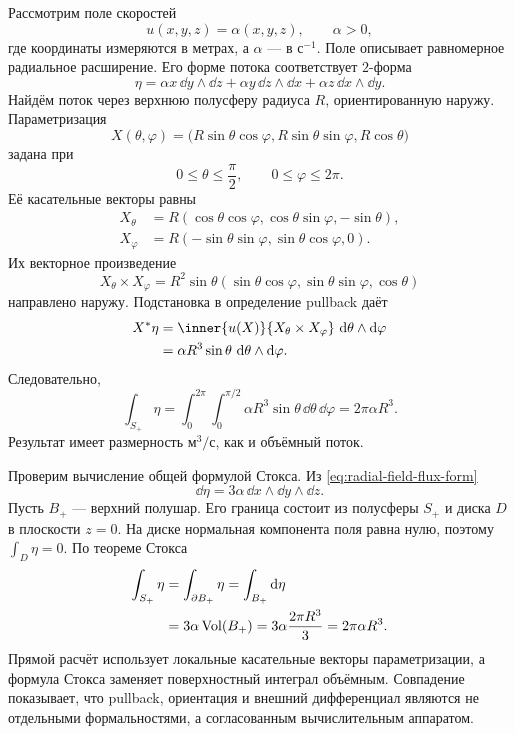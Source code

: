 Рассмотрим поле скоростей
\begin{equation}
\label{eq:radial-expansion-field}
u(x,y,z)=\alpha(x,y,z),
\qquad
\alpha>0,
\end{equation}
где координаты измеряются в метрах, а \(\alpha\) --- в \(\text{с}^{-1}\). Поле описывает равномерное радиальное расширение. Его форме потока соответствует \(2\)-форма
\begin{equation}
\label{eq:radial-field-flux-form}
\eta
=
\alpha x\,\dd y\wedge\dd z
+
\alpha y\,\dd z\wedge\dd x
+
\alpha z\,\dd x\wedge\dd y.
\end{equation}
Найдём поток через верхнюю полусферу радиуса \(R\), ориентированную наружу. Параметризация
\[
X(\theta,\varphi)
=
\bigl(
R\sin\theta\cos\varphi,
R\sin\theta\sin\varphi,
R\cos\theta
\bigr)
\]
задана при
\[
0\le\theta\le\frac{\pi}{2},
\qquad
0\le\varphi\le2\pi.
\]
Её касательные векторы равны
\begin{align*}
X_\theta
&=
R(\cos\theta\cos\varphi,
\cos\theta\sin\varphi,-\sin\theta),\\
X_\varphi
&=
R(-\sin\theta\sin\varphi,
\sin\theta\cos\varphi,0).
\end{align*}
Их векторное произведение
\begin{equation}
\label{eq:hemisphere-oriented-area-vector}
X_\theta\times X_\varphi
=
R^2\sin\theta
(\sin\theta\cos\varphi,
\sin\theta\sin\varphi,
\cos\theta)
\end{equation}
направлено наружу. Подстановка в определение pullback даёт
\begin{align}
X^*\eta
&=
\inner{u(X)}{X_\theta\times X_\varphi}
\,\dd\theta\wedge\dd\varphi\notag\\
&=
\alpha R^3\sin\theta
\,\dd\theta\wedge\dd\varphi.
\label{eq:hemisphere-flux-pullback}
\end{align}
Следовательно,
\begin{equation}
\label{eq:hemisphere-flux-direct}
\int_{S_+}\eta
=
\int_0^{2\pi}\int_0^{\pi/2}
\alpha R^3\sin\theta\,\dd\theta\,\dd\varphi
=
2\pi\alpha R^3.
\end{equation}
Результат имеет размерность \(\text{м}^3/\text{с}\), как и объёмный поток.

Проверим вычисление общей формулой Стокса. Из \eqref{eq:radial-field-flux-form}
\begin{equation}
\label{eq:radial-flux-form-exterior-derivative}
\dd\eta
=3\alpha\,\dd x\wedge\dd y\wedge\dd z.
\end{equation}
Пусть \(B_+\) --- верхний полушар. Его граница состоит из полусферы \(S_+\) и диска \(D\) в плоскости \(z=0\). На диске нормальная компонента поля равна нулю, поэтому \(\int_D\eta=0\). По теореме Стокса
\begin{align}
\int_{S_+}\eta
&=
\int_{\partial B_+}\eta
=
\int_{B_+}\mathop{}\!\mathrm{d}\eta\notag\\
&=
3\alpha\operatorname{Vol}(B_+)
=
3\alpha\frac{2\pi R^3}{3}
=
2\pi\alpha R^3.
\label{eq:hemisphere-flux-stokes-check}
\end{align}
Прямой расчёт использует локальные касательные векторы параметризации, а формула Стокса заменяет поверхностный интеграл объёмным. Совпадение показывает, что pullback, ориентация и внешний дифференциал являются не отдельными формальностями, а согласованным вычислительным аппаратом.

